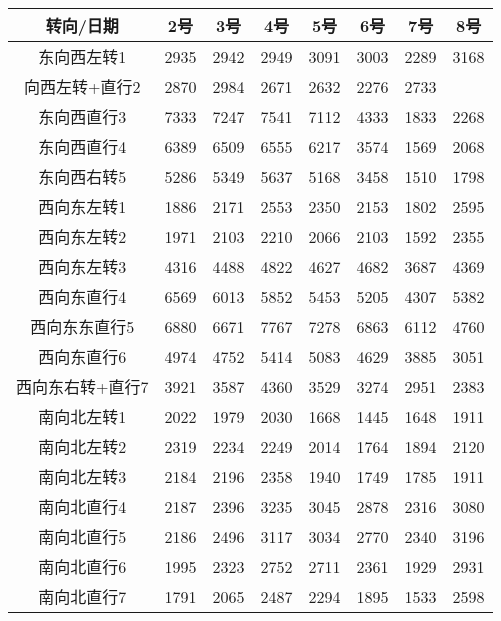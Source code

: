 \documentclass[UTF8]{article}
\begin{document}
    \begin{table}[h]
        \begin{tabular}{cccccccc}
            \hline
            转向/日期 & 2号 & 3号 & 4号 & 5号 & 6号 & 7号 & 8号 \\
            \hline
            东向西左转1	& 2935	&2942	&2949	&3091	&3003	&2289	&3168\\
            \hline
            向西左转+直行2	&2870	&2984	&2671	&2632	&2276	&2733\\
            \hline
            东向西直行3	&7333	&7247	&7541	&7112	&4333	&1833	&2268\\
            \hline
            东向西直行4	&6389	&6509	&6555	&6217	&3574	&1569	&2068\\
            \hline
            东向西右转5	&5286	&5349	&5637	&5168	&3458	&1510	&1798\\
            \hline
            西向东左转1	&1886	&2171	&2553	&2350	&2153	&1802	&2595\\
            \hline
            西向东左转2	&1971	&2103	&2210	&2066	&2103	&1592	&2355\\
            \hline
            西向东左转3	&4316	&4488	&4822	&4627	&4682	&3687	&4369\\
            \hline
            西向东直行4	&6569	&6013	&5852	&5453	&5205	&4307	&5382\\
            \hline
            西向东东直行5	&6880	&6671	&7767	&7278	&6863	&6112	&4760\\
            \hline
            西向东直行6	&4974	&4752	&5414	&5083	&4629	&3885	&3051\\
            \hline
            西向东右转+直行7	&3921	&3587	&4360	&3529	&3274	&2951	&2383\\
            \hline
            南向北左转1	&2022	&1979	&2030	&1668	&1445	&1648	&1911\\
            \hline
            南向北左转2	&2319	&2234	&2249	&2014	&1764	&1894	&2120\\
            \hline
            南向北左转3	&2184	&2196	&2358	&1940	&1749	&1785	&1911\\
            \hline
            南向北直行4	&2187	&2396	&3235	&3045	&2878	&2316	&3080\\
            \hline
            南向北直行5	&2186	&2496	&3117	&3034	&2770	&2340	&3196\\
            \hline
            南向北直行6	&1995	&2323	&2752	&2711	&2361	&1929	&2931\\
            \hline
            南向北直行7	&1791	&2065	&2487	&2294	&1895	&1533	&2598\\

\end{tabular}
\end{table}
\end{document}
